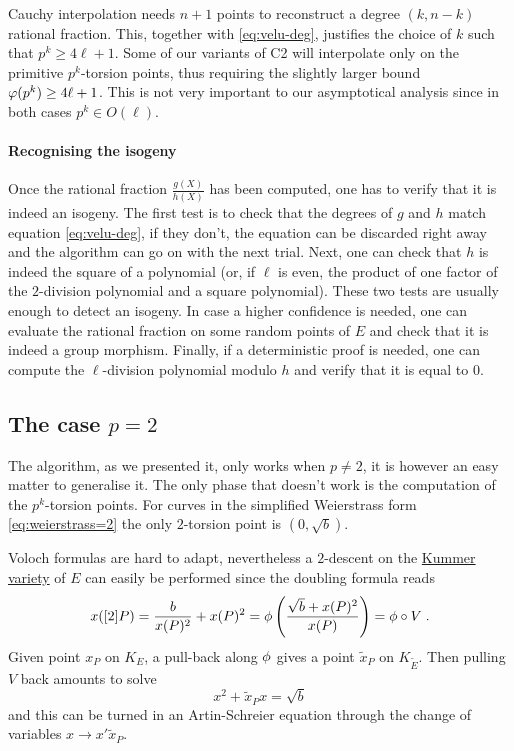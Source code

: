 Cauchy interpolation needs $n+1$ points to reconstruct a degree
$(k,n-k)$ rational fraction. This, together with \eqref{eq:velu-deg},
justifies the choice of $k$ such that $p^k \ge 4\ell+1$. Some of our
variants of C2 will interpolate only on the primitive $p^k$-torsion
points, thus requiring the slightly larger bound $\varphi(p^k) \ge
4\ell+1$. This is not very important to our asymptotical analysis
since in both cases $p^k \in O(\ell)$.

\paragraph{Recognising the isogeny}
Once the rational fraction $\frac{g(X)}{h(X)}$ has been computed, one
has to verify that it is indeed an isogeny. The first test is to check
that the degrees of $g$ and $h$ match equation \eqref{eq:velu-deg}, if
they don't, the equation can be discarded right away and the algorithm
can go on with the next trial. Next, one can check that $h$ is indeed
the square of a polynomial (or, if $\ell$ is even, the product of one
factor of the $2$-division polynomial and a square polynomial). These
two tests are usually enough to detect an isogeny. In case a higher
confidence is needed, one can evaluate the rational fraction on some
random points of $E$ and check that it is indeed a group
morphism. Finally, if a deterministic proof is needed, one can compute
the $\ell$-division polynomial modulo $h$ and verify that it is equal
to $0$.


\subsection{The case \texorpdfstring{$p=2$}{p=2}}
\label{sec:p=2}
The algorithm, as we presented it, only works when $p\ne2$, it is
however an easy matter to generalise it. The only phase that doesn't
work is the computation of the $p^k$-torsion points. For curves in the
simplified Weierstrass form \eqref{eq:weierstrass=2} the only
$2$-torsion point is $(0,\sqrt{b})$.

Voloch formulas are hard to adapt, nevertheless a $2$-descent on the
\hyperref[def:kummer]{Kummer variety} of $E$ can easily be performed
since the doubling formula reads
\begin{equation}
  x([2]P) = \frac{b}{x(P)^2} + x(P)^2 =
  \phi\left(\frac{\sqrt{b} + x(P)^2}{x(P)} \right) = \phi\circ V
  \;\text{.}
\end{equation}
Given point $x_P$ on $K_E$, a pull-back along $\phi$ gives a
point $\tilde{x}_P$ on $K_{\widetilde{E}}$. Then pulling $V$ back
amounts to solve
\begin{equation}
  \label{eq:2-descent}
  x^2 + \tilde{x}_Px = \sqrt{b}
\end{equation}
and this can be turned in an Artin-Schreier equation through the
change of variables $x \rightarrow x'\tilde{x}_P$.

